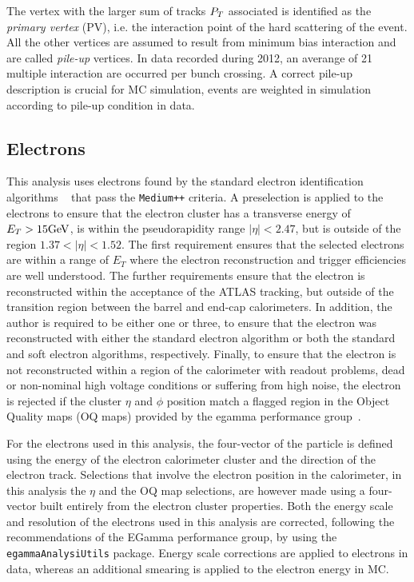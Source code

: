 The vertex with the larger sum of tracks $P_{T}$ associated is identified as the \emph{primary vertex} (PV), 
i.e. the interaction point of the hard scattering of the event. All the other vertices are assumed to result from
minimum bias interaction and are called \emph{pile-up} vertices.
In data recorded during 2012, an averange of 21 multiple interaction are occurred per bunch crossing.
A correct pile-up description is crucial for MC simulation, events are weighted in simulation according to pile-up 
condition in data.



\subsection{Electrons}
\label{sec:presel:elec}

This analysis uses electrons found by the standard electron
identification algorithms ~\cite{AtlasCSCBook} that pass the {\tt Medium++}
criteria. A preselection is applied to the electrons to ensure that
the electron cluster has a transverse energy of $E_T > 15\text{GeV}$, is
within the pseudorapidity range $|\eta|<2.47$, but is outside of the region
$1.37<|\eta|<1.52$. The first requirement ensures that the selected
electrons are within a range of $E_T$ where the electron reconstruction
and trigger efficiencies are well understood. The further requirements
ensure that the electron is reconstructed within the acceptance of
the ATLAS tracking, but outside of the transition region between the
barrel and end-cap calorimeters. 
In addition, the author is required to be either one or three, to ensure that the electron was 
reconstructed with either the standard electron algorithm or both the
standard and soft electron algorithms, respectively.
Finally, to ensure that the electron is not reconstructed within a region of the
calorimeter with readout problems, dead or non-nominal high voltage
conditions or suffering from high noise, the electron is rejected if
the cluster $\eta$ and $\phi$ position match a flagged region in the
Object Quality maps (OQ maps) provided by the egamma
performance group~\cite{EGammaRecomendations}.

For the electrons used in this analysis, the four-vector of the
particle is defined using the energy of the electron calorimeter
cluster and the direction of the electron track. Selections that
involve the electron position in the calorimeter, in this analysis the
$\eta$ and the OQ map selections, are however made using a four-vector built
entirely from the electron cluster properties. Both the energy scale
and resolution of the electrons used in this analysis are corrected,
following the recommendations of the EGamma performance group, by
using the {\tt egammaAnalysiUtils}
package\cite{EGammaRecomendations}. Energy scale corrections are
applied to electrons in data, whereas an additional smearing is
applied to the electron energy in MC.

